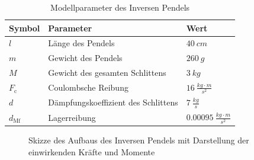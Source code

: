 \begin{table}[H]
    \centering
    \begin{tabular}{lll}
        \hline
        Symbol   & Parameter                           & Wert                                   \\ \hline
        $l$      & Länge des Pendels                   & $\SI{40}{cm}$                          \\
        $m$      & Gewicht des Pendels                 & $\SI{260}{g}$                          \\
        $M$      & Gewicht des gesamten Schlittens     & $\SI{3}{kg}$                           \\
        $F_{\mathrm{c}}$    & Coulombsche Reibung      & $\SI{16}{\frac{kg \cdot m}{s^2}}$      \\
        $d$      & Dämpfungskoeffizient des Schlittens & $\SI{7}{\frac{kg}{s}}$                 \\
        $d_{\mathrm{Mf}}$ & Lagerreibung               & $\SI{0.00095}{\frac{kg \cdot m}{s^2}}$ \\ \hline
    \end{tabular}
    \caption{Modellparameter des Inversen Pendels}
    \label{tab:my-table1}
\end{table}

\begin{figure}[H]
   \centering
   \caption[Skizze des Aufbaus der Regelaufgabe]{Skizze des Aufbaus des Inversen Pendels mit Darstellung der einwirkenden Kräfte und Momente}
   \label{fig:Bild1}
\end{figure}